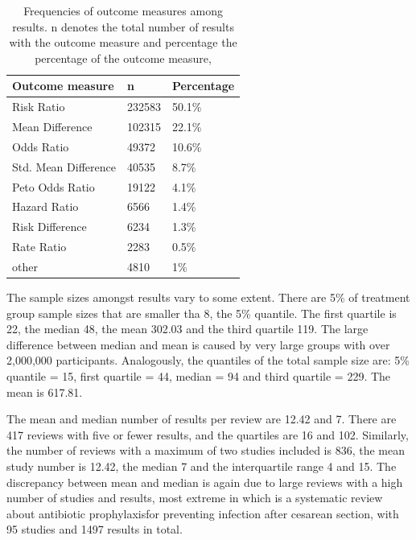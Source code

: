 \documentclass[11pt,a4paper,twoside]{book}\usepackage[]{graphicx}\usepackage[]{color}
\begin{document}
\begin{table}[ht]
\centering
\begingroup\footnotesize
\begin{tabular}{lll}
  \hline
Outcome measure & n & Percentage \\ 
  \hline
Risk Ratio & 232583 & 50.1\% \\ 
  Mean Difference & 102315 & 22.1\% \\ 
  Odds Ratio & 49372 & 10.6\% \\ 
  Std. Mean Difference & 40535 & 8.7\% \\ 
  Peto Odds Ratio & 19122 & 4.1\% \\ 
  Hazard Ratio & 6566 & 1.4\% \\ 
  Risk Difference & 6234 & 1.3\% \\ 
  Rate Ratio & 2283 & 0.5\% \\ 
  other & 4810 & 1\% \\ 
   \hline
\end{tabular}
\endgroup
\caption{Frequencies of outcome measures among results. n denotes the total number 
             of results with the outcome measure and percentage the percentage of the outcome measure,} 
\label{outcome.measure.frequencies}
\end{table}



The sample sizes amongst results vary to some extent. There are 5\% of treatment group sample sizes that are smaller tha 8, the 5\% quantile. The first quartile is 22, the median 48, the mean 302.03 and the third quartile 119. The large difference between median and mean is caused by very large groups with over 2,000,000 participants. Analogously, the quantiles of the total sample size are: 5\% quantile = 15, first quartile = 44, median = 94 and third quartile = 229. The mean is 617.81.

\vspace{0mm}
The mean and median number of results per review are 12.42 and 7. There are 417 reviews with five or fewer results, and the quartiles are 16 and 102. Similarly, the number of reviews with a maximum of two studies included is 836, the mean study number is 12.42, the median 7 and the interquartile range 4 and 15. The discrepancy between mean and median is again due to large reviews with a high number of studies and results, most extreme in \citet{largest.review} which is a systematic review about antibiotic prophylaxisfor preventing infection after cesarean section, with 95 studies and 1497 results in total. 
\end{document}
